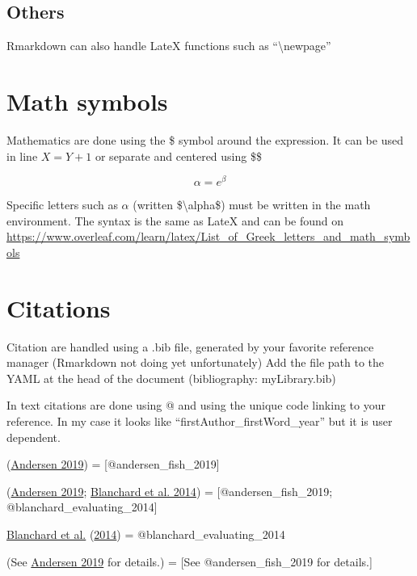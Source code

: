 \documentclass[
  11pt,
]{article}
\begin{document}
\hypertarget{others}{%
\subsection{Others}\label{others}}

Rmarkdown can also handle LateX functions such as ``\textbackslash newpage''

\newpage

\hypertarget{math-symbols}{%
\section{Math symbols}\label{math-symbols}}

Mathematics are done using the \$ symbol around the expression. It can be used in line \(X = Y + 1\) or separate and centered using \$\$

\[\alpha = e{^\beta}\]

Specific letters such as \(\alpha\) (written \$\textbackslash alpha\$) must be written in the math environment. The syntax is the same as LateX and can be found on \url{https://www.overleaf.com/learn/latex/List_of_Greek_letters_and_math_symbols}

\hypertarget{citations}{%
\section{Citations}\label{citations}}

Citation are handled using a .bib file, generated by your favorite reference manager (Rmarkdown not doing yet unfortunately)
Add the file path to the YAML at the head of the document (bibliography: myLibrary.bib)

In text citations are done using @ and using the unique code linking to your reference. In my case it looks like ``firstAuthor\_firstWord\_year'' but it is user dependent.

(\protect\hyperlink{ref-andersen_fish_2019}{Andersen 2019}) = {[}@andersen\_fish\_2019{]}

(\protect\hyperlink{ref-andersen_fish_2019}{Andersen 2019}; \protect\hyperlink{ref-blanchard_evaluating_2014}{Blanchard et al. 2014}) = {[}@andersen\_fish\_2019; @blanchard\_evaluating\_2014{]}

\protect\hyperlink{ref-blanchard_evaluating_2014}{Blanchard et al.} (\protect\hyperlink{ref-blanchard_evaluating_2014}{2014}) = @blanchard\_evaluating\_2014

(See \protect\hyperlink{ref-andersen_fish_2019}{Andersen 2019} for details.) = {[}See @andersen\_fish\_2019 for details.{]}
\end{document}
